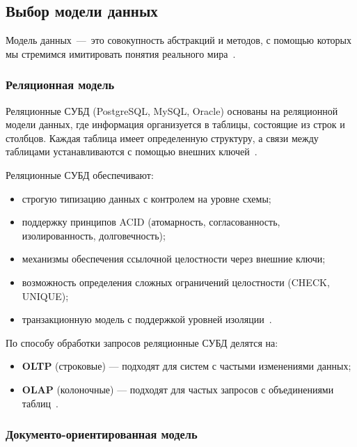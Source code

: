 \subsection{Выбор модели данных}

\noindent
\hspace{0.75cm}
Модель данных~---~это совокупность абстракций и методов, с помощью которых мы стремимся имитировать понятия реального мира~\cite{komarov}.

\subsubsection{Реляционная модель}

\noindent
\hspace{1.25cm}
Реляционные СУБД (PostgreSQL, MySQL, Oracle) основаны на реляционной модели данных, где информация организуется в таблицы, состоящие из строк и столбцов. Каждая таблица имеет определенную структуру, а связи между таблицами устанавливаются с помощью внешних ключей~\cite{vas_hus}.

\noindent
\hspace{1.25cm}
Реляционные СУБД обеспечивают:

\renewcommand{\labelitemi}{---}
\begin{itemize}
    \item строгую типизацию данных с контролем на уровне схемы;
    \item поддержку принципов ACID (атомарность, согласованность, изолированность, долговечность);
    \item механизмы обеспечения ссылочной целостности через внешние ключи;
    \item возможность определения сложных ограничений целостности (CHECK, UNIQUE);
    \item транзакционную модель с поддержкой уровней изоляции~\cite{vas_hus}.
\end{itemize}

\noindent
\hspace{1.25cm}
По способу обработки запросов реляционные СУБД делятся на:
\begin{itemize}
    \item \textbf{OLTP} (строковые) --- подходят для систем с частыми изменениями данных;
    \item \textbf{OLAP} (колоночные) --- подходят для частых запросов с объединениями таблиц~\cite{vas_hus}.
\end{itemize}

\subsubsection{Документо-ориентированная модель}

